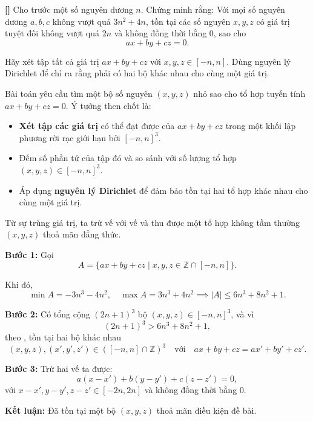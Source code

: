 \documentclass[../01-divisibility.tex]{subfiles}
\begin{document}
\begin{example*}\label{example:CHN-2015-TST1-D2-P2}\textbf{[]}
	Cho trước một số nguyên dương \( n \). Chứng minh rằng: Với mọi số nguyên dương \( a, b, c \) không vượt quá \( 3n^2 + 4n \),
	tồn tại các số nguyên \( x, y, z \) có giá trị tuyệt đối không vượt quá \( 2n \) và không đồng thời bằng 0, sao cho
	\[
		ax + by + cz = 0.
	\]
\end{example*}

\begin{remark*}
    Hãy xét tập tất cả giá trị \( ax + by + cz \) với \( x, y, z \in [-n, n] \). Dùng nguyên lý Dirichlet để chỉ ra rằng phải có hai bộ khác nhau cho cùng một giá trị.
\end{remark*}

\begin{story*}
    Bài toán yêu cầu tìm một bộ số nguyên \( (x, y, z) \) nhỏ sao cho tổ hợp tuyến tính \( ax + by + cz = 0 \). 
    Ý tưởng then chốt là:
    \begin{itemize}[topsep=0pt, partopsep=0pt, itemsep=0pt]
		\item \textbf{Xét tập các giá trị} có thể đạt được của \( ax + by + cz \) trong một khối lập phương rời rạc giới hạn bởi \( [-n, n]^3 \).
		\item Đếm số phần tử của tập đó và so sánh với số lượng tổ hợp \( (x, y, z) \in [-n, n]^3 \).
		\item Áp dụng \textbf{nguyên lý Dirichlet} để đảm bảo tồn tại hai tổ hợp khác nhau cho cùng một giá trị.
	\end{itemize}
	Từ sự trùng giá trị, ta trừ vế với vế và thu được một tổ hợp không tầm thường \( (x, y, z) \) thoả mãn đẳng thức.
\end{story*}

\bigbreak

\begin{soln}\footnotemark
	\textbf{Bước 1:} Gọi  
	\[
		A = \{ ax + by + cz \mid x, y, z \in \mathbb{Z} \cap [-n, n] \}.
	\]
	
	Khi đó,
	\[
		\min A = -3n^3 - 4n^2,\quad \max A = 3n^3 + 4n^2 
		\implies |A| \leq 6n^3 + 8n^2 + 1.
	\]

	\textbf{Bước 2:} Có tổng cộng \( (2n + 1)^3 \) bộ \( (x, y, z) \in [-n, n]^3 \), và vì
	\[
		(2n+1)^3 > 6n^3 + 8n^2 + 1,
	\]
	theo , tồn tại hai bộ khác nhau
	\[
		(x, y, z), (x', y', z') \in ([-n, n] \cap \mathbb{Z})^3 \quad \text{với} \quad ax + by + cz = ax' + by' + cz'.
	\]

	\textbf{Bước 3:} Trừ hai vế ta được:
	\[
		a(x - x') + b(y - y') + c(z - z') = 0,
	\]
	với \( x - x', y - y', z - z' \in [-2n, 2n] \) và không đồng thời bằng 0.

	\textbf{Kết luận:} Đã tồn tại một bộ \( (x, y, z) \) thoả mãn điều kiện đề bài.
\end{soln}

\end{document}
